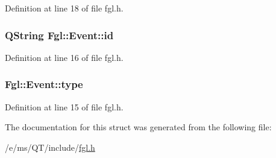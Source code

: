 Definition at line 18 of file fgl.h.

\hypertarget{structFgl_1_1Event_a28367efebda5c671dc1e82084e18f0eb}{
\subsubsection[{id}]{\setlength{\rightskip}{0pt plus 5cm}QString {\bf Fgl::Event::id}}}
\label{structFgl_1_1Event_a28367efebda5c671dc1e82084e18f0eb}


Definition at line 16 of file fgl.h.

\hypertarget{structFgl_1_1Event_afa40f4cb59b82a49e431a4233e77aa37}{
\subsubsection[{type}]{ {\bf Fgl::Event::type}}}
\label{structFgl_1_1Event_afa40f4cb59b82a49e431a4233e77aa37}


Definition at line 15 of file fgl.h.



The documentation for this struct was generated from the following file:\begin{DoxyCompactItemize}
\item 
/e/ms/QT/include/\hyperlink{fgl_8h}{fgl.h}\end{DoxyCompactItemize}
